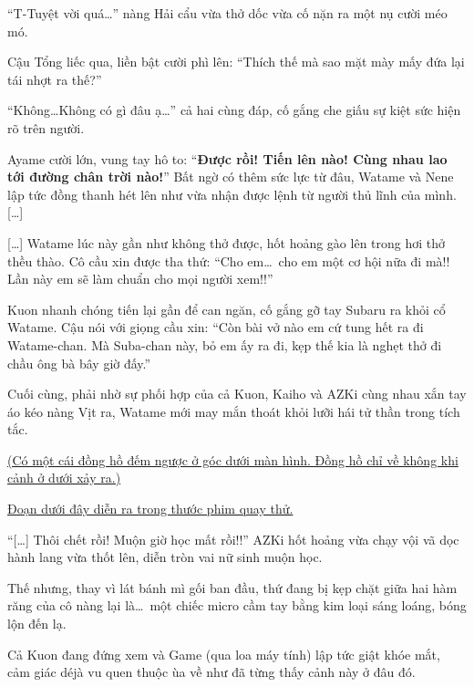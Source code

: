 \documentclass[../main.tex]{subfiles}
\begin{document}
``T-Tuyệt vời quá\dots'' nàng Hải cẩu vừa thở dốc vừa cố nặn ra một nụ cười méo mó.

Cậu Tổng liếc qua, liền bật cười phì lên: ``Thích thế mà sao mặt mày mấy đứa lại tái nhợt ra thế?''

``Không\dots Không có gì đâu ạ\dots'' cả hai cùng đáp, cố gắng che giấu sự kiệt sức hiện rõ trên người.

Ayame cười lớn, vung tay hô to: ``\textbf{Được rồi! Tiến lên nào! Cùng nhau lao tới đường chân trời nào!}'' Bất ngờ có thêm sức lực từ đâu, Watame và Nene lập tức đồng thanh hét lên như vừa nhận được lệnh từ người thủ lĩnh của mình. [\dots]

{\color{gold}}   %

[\dots] Watame lúc này gần như không thở được, hốt hoảng gào lên trong hơi thở thều thào. Cô cầu xin được tha thứ: ``Cho em\dots\ cho em một cơ hội nữa đi mà!! Lần này em sẽ làm chuẩn cho mọi người xem!!''

Kuon nhanh chóng tiến lại gần để can ngăn, cố gắng gỡ tay Subaru ra khỏi cổ Watame. Cậu nói với giọng cầu xin: ``Còn bài vở nào em cứ tung hết ra đi Watame-chan. Mà Suba-chan này, bỏ em ấy ra đi, kẹp thế kia là nghẹt thở đi chầu ông bà bây giờ đấy.''

Cuối cùng, phải nhờ sự phối hợp của cả Kuon, Kaiho và AZKi cùng nhau xắn tay áo kéo nàng Vịt ra, Watame mới may mắn thoát khỏi lưỡi hái tử thần trong tích tắc.

\begin{center}
  \uline{(Có một cái đồng hồ đếm ngược ở góc dưới màn hình. Đồng hồ chỉ về không khi cảnh ở dưới xảy ra.)}
\end{center}

\ct

\begin{center}
  \uline{Đoạn dưới đây diễn ra trong thước phim quay thử.}
\end{center}

``[\dots] Thôi chết rồi! Muộn giờ học mất rồi!!'' AZKi hốt hoảng vừa chạy vội vã dọc hành lang vừa thốt lên, diễn tròn vai nữ sinh muộn học.

Thế nhưng, thay vì lát bánh mì gối ban đầu, thứ đang bị kẹp chặt giữa hai hàm răng của cô nàng lại là\dots\ một chiếc micro cầm tay bằng kim loại sáng loáng, bóng lộn đến lạ.


Cả Kuon đang đứng xem và Game (qua loa máy tính) lập tức giật khóe mắt, cảm giác déjà vu quen thuộc ùa về như đã từng thấy cảnh này ở đâu đó.
\end{document}
